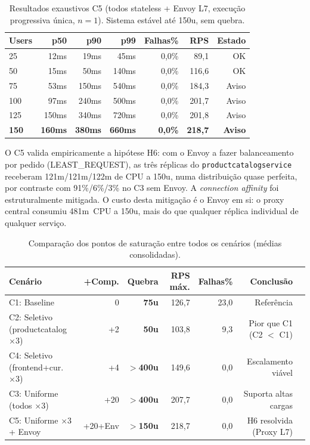 \documentclass[manuscript,oneside]{acmart}
\begin{document}
\begin{table}[H]
\caption{Resultados exaustivos C5 (todos stateless  + Envoy L7, execução progressiva única, $n=1$). Sistema estável até 150u, sem quebra.}
\label{tab:c5ex}
\begin{tabular}{lrrrrrr}
\toprule
\textbf{Users} & \textbf{p50} & \textbf{p90} & \textbf{p99} & \textbf{Falhas\%} & \textbf{RPS} & \textbf{Estado} \\
\midrule
25  & 12ms  & 19ms  & 45ms  & 0,0\% & 89,1  & OK \\
50  & 15ms  & 50ms  & 140ms & 0,0\% & 116,6 & OK \\
75  & 53ms  & 150ms & 540ms & 0,0\% & 184,3 & Aviso \\
100 & 97ms  & 240ms & 500ms & 0,0\% & 201,7 & Aviso \\
125 & 150ms & 340ms & 720ms & 0,0\% & 201,8 & Aviso \\
\textbf{150} & \textbf{160ms} & \textbf{380ms} & \textbf{660ms} & \textbf{0,0\%} & \textbf{218,7} & \textbf{Aviso} \\
\bottomrule
\end{tabular}
\end{table}

O C5 valida empiricamente a hipótese H6: com o Envoy a fazer balanceamento por pedido (LEAST\_REQUEST), as três réplicas do \texttt{productcatalogservice} receberam 121m/121m/122m de CPU a 150u, numa distribuição quase perfeita, por contraste com 91\%/6\%/3\% no C3 sem Envoy. A \textit{connection affinity} foi estruturalmente mitigada. O custo desta mitigação é o Envoy em si: o proxy central consumiu 481m~CPU a 150u, mais do que qualquer réplica individual de qualquer serviço.

\begin{table}[H]
\caption{Comparação dos pontos de saturação entre todos os cenários (médias consolidadas).}
\label{tab:saturacao}
\begin{tabularx}{\columnwidth}{lrrrrrX}
\toprule
\textbf{Cenário} & \textbf{+Comp.} & \textbf{Quebra} & \textbf{RPS máx.} & \textbf{Falhas\%} & \textbf{Conclusão} \\
\midrule
C1: Baseline                        & 0       & \textbf{75u}     & 126,7 & 23,0 & Referência \\
C2: Seletivo (productcatalog ×3)    & +2      & \textbf{50u}     & 103,8 &  9,3 & Pior que C1 (C2 $<$ C1) \\
C4: Seletivo (frontend+cur. ×3)     & +4      & \textbf{$>$400u} & 149,6 & 0,0  & Escalamento viável \\
C3: Uniforme (todos ×3)             & +20     & \textbf{$>$400u} & 207,7 & 0,0  & Suporta altas cargas \\
C5: Uniforme ×3 + Envoy             & +20+Env & \textbf{$>$150u} & 218,7 & 0,0  & H6 resolvida (Proxy L7) \\
\bottomrule
\end{tabularx}
\end{table}
\end{document}
